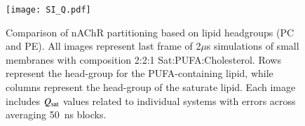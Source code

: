 	\begin{figure}[!ht]
		\center
		\texttt{[image: SI\_Q.pdf]}
		\caption{ Comparison of nAChR partitioning based on lipid headgroups (PC and PE). All images represent last frame of 2$\mu$s  simulations of small membranes with composition  2:2:1 Sat:PUFA:Cholesterol.  Rows represent the head-group for the PUFA-containing lipid, while columns represent the head-group of the saturate lipid.   Each image includes $Q_{\mathrm{sat}}$ values related to individual systems with errors across averaging 50~ns blocks.}
		\label{fig:SIQ}
	\end{figure}
	
